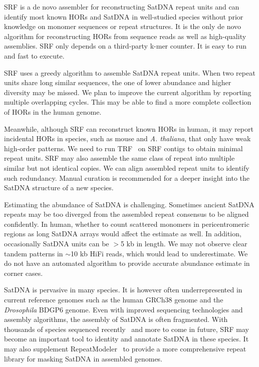 \documentclass{bioinfo}
\begin{document}
SRF is a de novo assembler for reconstructing SatDNA repeat units and can
identify most known HORs and SatDNA in well-studied species without prior
knowledge on monomer sequences or repeat structures. It is the only de novo
algorithm for reconstructing HORs from sequence reads as well as high-quality
assemblies. SRF only depends on a third-party k-mer counter. It is easy to run
and fast to execute.

SRF uses a greedy algorithm to assemble SatDNA repeat units. When two repeat
units share long similar sequences, the one of lower abundance and higher
diversity may be missed. We plan to improve the current algorithm by reporting
multiple overlapping cycles. This may be able to find a more complete
collection of HORs in the human genome.

Meanwhile, although SRF can reconstruct known HORs in human, it may report
incidental HORs in species, such as mouse and \emph{A. thaliana}, that only
have weak high-order patterns. We need to run TRF~\citep{Benson:1999aa} on SRF
contigs to obtain minimal repeat units. SRF may also assemble the same class of
repeat into multiple similar but not identical copies. We can align assembled
repeat units to identify such redundancy. Manual curation is recommended for a
deeper insight into the SatDNA structure of a new species.

Estimating the abundance of SatDNA is challenging. Sometimes ancient SatDNA
repeats may be too diverged from the assembled repeat consensus to be aligned
confidently. In human, whether to count scattered monomers in pericentromeric
regions as long SatDNA arrays would affect the estimate as well. In addition,
occasionally SatDNA units can be $>$5 kb in length. We may not observe clear
tandem patterns in $\sim$10 kb HiFi reads, which would lead to underestimate.
We do not have an automated algorithm to provide accurate abundance estimate in
corner cases.

SatDNA is pervasive in many species. It is however often underrepresented in
current reference genomes such as the human GRCh38 genome and the
\emph{Drosophila} BDGP6 genome. Even with improved sequencing technologies and
assembly algorithms, the assembly of SatDNA is often fragmented. With thousands
of species sequenced recently~\citep{Challis:2020aa,Rhie:2021ug} and more to
come in future, SRF may become an important tool to identity and annotate
SatDNA in these species. It may also supplement
RepeatModeler~\citep{Flynn:2020aa} to provide a more comprehensive repeat
library for masking SatDNA in assembled genomes.
\end{document}
